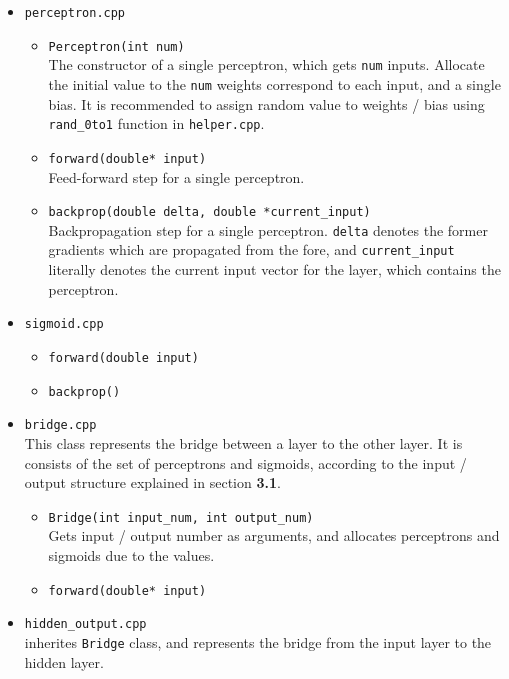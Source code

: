 \documentclass{oblivoir}
\begin{document}
\begin{itemize}
    \item \texttt{perceptron.cpp}
    \begin{itemize}
        \item \texttt{Perceptron(int num)} \\
        The constructor of a single perceptron, which gets \texttt{num} inputs. Allocate the initial value to the \texttt{num} weights correspond to each input, and a single bias. It is recommended to assign random value to weights / bias using \texttt{rand\_0to1} function in \texttt{helper.cpp}.
        \item \texttt{forward(double* input)} \\
        Feed-forward step for a single perceptron.
        \item \texttt{backprop(double delta, double *current\_input)} \\
        Backpropagation step for a single perceptron. \texttt{delta} denotes the former gradients which are propagated from the fore, and \texttt{current\_input} literally denotes the current input vector for the layer, which contains the perceptron.
    \end{itemize}
    \item \texttt{sigmoid.cpp}
    \begin{itemize}
        \item \texttt{forward(double input)}
        \item \texttt{backprop()}
    \end{itemize}
    \item \texttt{bridge.cpp} \\
    This class represents the bridge between a layer to the other layer. It is consists of the set of perceptrons and sigmoids, according to the input / output structure explained in section \textbf{3.1}. 
    \begin{itemize}
        \item \texttt{Bridge(int input\_num, int output\_num)} \\
        Gets input / output number as arguments, and allocates perceptrons and sigmoids due to the values. 
        \item \texttt{forward(double* input)}
    \end{itemize}
    \item \texttt{hidden\_output.cpp}
    \\ inherites \texttt{Bridge} class, and represents the bridge from the input layer to the hidden layer.

\end{itemize}
\end{document}
